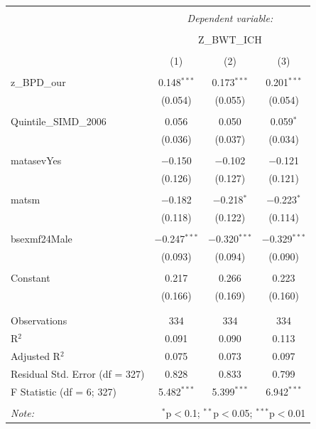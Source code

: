 \documentclass[a0,portrait]{a0poster}
\begin{document}
\begin{multicols}{2}
\begin{center} \centering 
  \label{abdn-models} 
\begin{tabular}{@{\extracolsep{5pt}}lccc} 
\\[-1.8ex]\hline 
\hline \\[-1.8ex] 
 & \multicolumn{3}{c}{\textit{Dependent variable:}} \\ 
\cline{2-4} 
\\[-1.8ex] & \multicolumn{3}{c}{Z\_BWT\_ICH} \\ 
\\[-1.8ex] & (1) & (2) & (3)\\ 
\hline \\[-1.8ex] 
 z\_BPD\_our & 0.148$^{***}$ & 0.173$^{***}$ & 0.201$^{***}$ \\ 
  & (0.054) & (0.055) & (0.054) \\ 
  & & & \\ 
 Quintile\_SIMD\_2006 & 0.056 & 0.050 & 0.059$^{*}$ \\ 
  & (0.036) & (0.037) & (0.034) \\ 
  & & & \\ 
 matasevYes & $-$0.150 & $-$0.102 & $-$0.121 \\ 
  & (0.126) & (0.127) & (0.121) \\ 
  & & & \\ 
 matsm & $-$0.182 & $-$0.218$^{*}$ & $-$0.223$^{*}$ \\ 
  & (0.118) & (0.122) & (0.114) \\ 
  & & & \\ 
 bsexmf24Male & $-$0.247$^{***}$ & $-$0.320$^{***}$ & $-$0.329$^{***}$ \\ 
  & (0.093)  & (0.094) & (0.090) \\ 
  & & & \\ 
 Constant & 0.217 & 0.266 & 0.223 \\ 
  & (0.166) & (0.169) & (0.160) \\ 
  & & & \\ 
\hline \\[-1.8ex] 
Observations & 334 & 334 & 334 \\ 
R$^{2}$ & 0.091 & 0.090 & 0.113 \\ 
Adjusted R$^{2}$ & 0.075 & 0.073 & 0.097 \\ 
Residual Std. Error (df = 327) & 0.828 & 0.833 & 0.799 \\ 
F Statistic (df = 6; 327) & 5.482$^{***}$ & 5.399$^{***}$ & 6.942$^{***}$ \\ 
\hline 
\hline \\[-1.8ex] 
\textit{Note:}  & \multicolumn{3}{r}{$^{*}$p$<$0.1; $^{**}$p$<$0.05; $^{***}$p$<$0.01} \\ 
\end{tabular} 
\end{center} 


\end{multicols}
\end{document}
